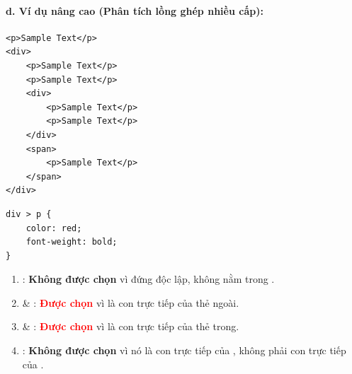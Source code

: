 \paragraph{d. Ví dụ nâng cao (Phân tích lồng ghép nhiều cấp):}

\begin{codeWindow}
\begin{lstlisting}[language=HTML5]
<p>Sample Text</p>
<div>
    <p>Sample Text</p>
    <p>Sample Text</p>
    <div>
        <p>Sample Text</p>
        <p>Sample Text</p>
    </div>
    <span>
        <p>Sample Text</p>
    </span>
</div>
\end{lstlisting}

\begin{lstlisting}[language=CSS3]
div > p {
    color: red;
    font-weight: bold;
}
\end{lstlisting}
\end{codeWindow}

\begin{noteBox}
\begin{enumerate}[leftmargin=1.5em, itemsep=3pt, parsep=0pt]
    \item {}: \textbf{Không được chọn} vì đứng độc lập, không nằm trong .
    \item {} \& : \textcolor{red}{\textbf{Được chọn}} vì là con trực tiếp của thẻ  ngoài.
    \item {} \& : \textcolor{red}{\textbf{Được chọn}} vì là con trực tiếp của thẻ  trong.
    \item {}: \textbf{Không được chọn} vì nó là con trực tiếp của , không phải con trực tiếp của .
\end{enumerate}
\end{noteBox}

